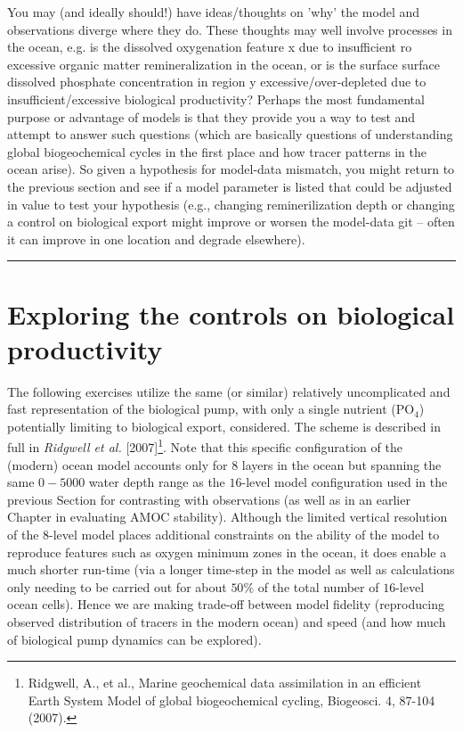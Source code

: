 You may (and ideally should!) have ideas/thoughts on 'why' the model and observations diverge where they do. These thoughts may well involve processes in the ocean, e.g. is the dissolved oxygenation feature x due to insufficient ro excessive organic matter remineralization in the ocean, or is the surface surface dissolved phosphate concentration in region y excessive/over-depleted due to insufficient/excessive biological productivity? Perhaps the most fundamental purpose or advantage of models is that they provide you a way to test and attempt to answer such questions (which are basically questions of understanding global biogeochemical cycles in the first place and how tracer patterns in the ocean arise). So given a hypothesis for model-data mismatch, you might return to the previous section and see if a model parameter is listed that could be adjusted in value to test your hypothesis (e.g., changing reminerilization depth or changing a control on biological export might improve or worsen the model-data git -- often it can improve in one location and degrade elsewhere).

\vspace{1mm} \noindent\rule{4cm}{0.1mm} \vspace{2mm}

\newpage

\section{Exploring the controls on biological productivity}

The following exercises utilize the same (or similar) relatively uncomplicated and fast representation of the biological pump, with only a single nutrient (PO$_{4}$) potentially limiting to biological export, considered. The scheme is described in full in \textit{Ridgwell et al.} [2007]\footnote{Ridgwell, A., et al., Marine geochemical data assimilation in an efficient Earth System Model of global biogeochemical cycling, Biogeosci. 4, 87-104 (2007).}. Note that this specific configuration of the (modern) ocean model accounts only for 8 layers in the ocean but spanning the same \(0-5000 \) water depth range as the $16$-level model configuration used in the previous Section for contrasting with observations (as well as in an earlier Chapter in evaluating AMOC stability). Although the limited vertical resolution of the $8$-level model places additional constraints on the ability of the model to reproduce features such as oxygen minimum zones in the ocean, it does enable a much shorter run-time (via a longer time-step in the model as well as calculations only needing to be carried out for about \(50\%\) of the total number of $16$-level ocean cells). Hence we are making  trade-off between model fidelity (reproducing observed distribution of tracers in the modern ocean) and speed (and how much of biological pump dynamics can be explored).


